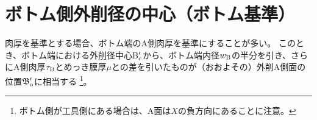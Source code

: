 \section{ボトム側外削径の中心（ボトム基準）}
肉厚を基準とする場合、ボトム端のA側肉厚を基準にすることが多い。
このとき、ボトム端における外削径中心B$_\text c'$から、ボトム端内径$w_\text B$の半分を引き、さらにA側肉厚$\tau_\text B$とめっき膜厚$\mu$との差を引いたものが（おおよその）外削A側面の位置$\mathfrak B_\text o'$に相当する
\footnote{ボトム側が工具側にある場合は、A面は$X$の負方向にあることに注意。}。


